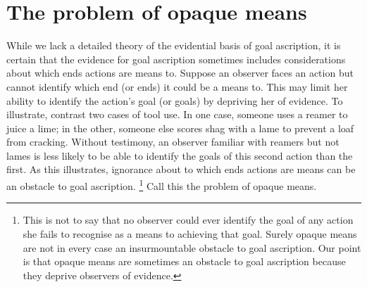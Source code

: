 \documentclass[12pt,a4paper]{extarticle}
\begin{document}
\section{The problem of opaque means}

While we lack a detailed theory of the evidential basis of goal ascription,
it is certain that the evidence for goal ascription sometimes includes considerations about which ends actions are means to.
Suppose an observer faces an action but cannot identify which end (or ends) it could be a means to.
This may limit her ability to identify the action's goal (or goals) by depriving her of evidence.
To illustrate, contrast two cases of tool use.
In one case, someone uses a reamer to  juice  a lime; in the other, someone else scores shag with a lame to prevent a loaf from cracking.
Without testimony, 
an observer familiar with reamers but not lames 
is less likely to be able to identify the goals of this second action than the first.
As this illustrates, ignorance about to which ends actions are means can be an obstacle to goal ascription.%
\footnote{
This is not to say that no observer could ever identify the goal of any action she fails to recognise as a means to achieving that goal.
Surely opaque means are not in every case an insurmountable obstacle to goal ascription.
Our point is that opaque means are sometimes an obstacle to goal ascription because they deprive observers of evidence.
}
Call this the problem of opaque means.
\end{document}
